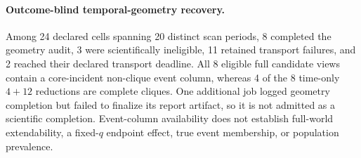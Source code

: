 \paragraph{Outcome-blind temporal-geometry recovery.}
Among 24 declared cells spanning 20 distinct scan periods, 8 completed the
geometry audit, 3 were scientifically ineligible, 11 retained transport
failures, and 2 reached their declared transport deadline. All 8 eligible full
candidate views contain a core-incident non-clique event column, whereas 4 of
the 8 time-only $4+12$ reductions are complete cliques. One additional job
logged geometry completion but failed to finalize its report artifact, so it is
not admitted as a scientific completion. Event-column availability does not
establish full-world extendability, a fixed-$q$ endpoint effect, true event
membership, or population prevalence.
